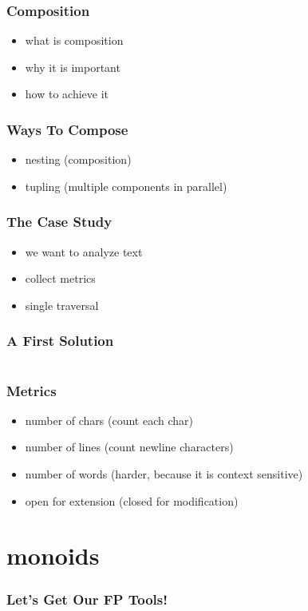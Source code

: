 \documentclass{beamer}
\begin{document}
\begin{frame}
  \frametitle{Composition}
  \begin{itemize}
  \item what is composition
  \item why it is important
  \item how to achieve it
  \end{itemize}
\end{frame}

\begin{frame}
  \frametitle{Ways To Compose}
  \begin{itemize}
  \item nesting (composition)
  \item tupling (multiple components in parallel)
  \end{itemize}
\end{frame}

\begin{frame}
  \frametitle{The Case Study}
  \begin{itemize}
  \item we want to analyze text
  \item collect metrics
  \item single traversal
  \end{itemize}
\end{frame}

\begin{frame}[fragile]
  \frametitle{A First Solution}
  \inputminted[fontsize=\small]{scala}{snippets/imperative-wc.scala}
\end{frame}

\begin{frame}
  \frametitle{Metrics}
  \begin{itemize}
  \item number of chars (count each char)
  \item number of lines (count newline characters)
  \item number of words (harder, because it is context sensitive)
  \item open for extension (closed for modification)
  \end{itemize}
\end{frame}

\section{monoids}\label{sec:monoids}

\begin{frame}
  \frametitle{Let's Get Our FP Tools!}
\end{frame}
\end{document}
